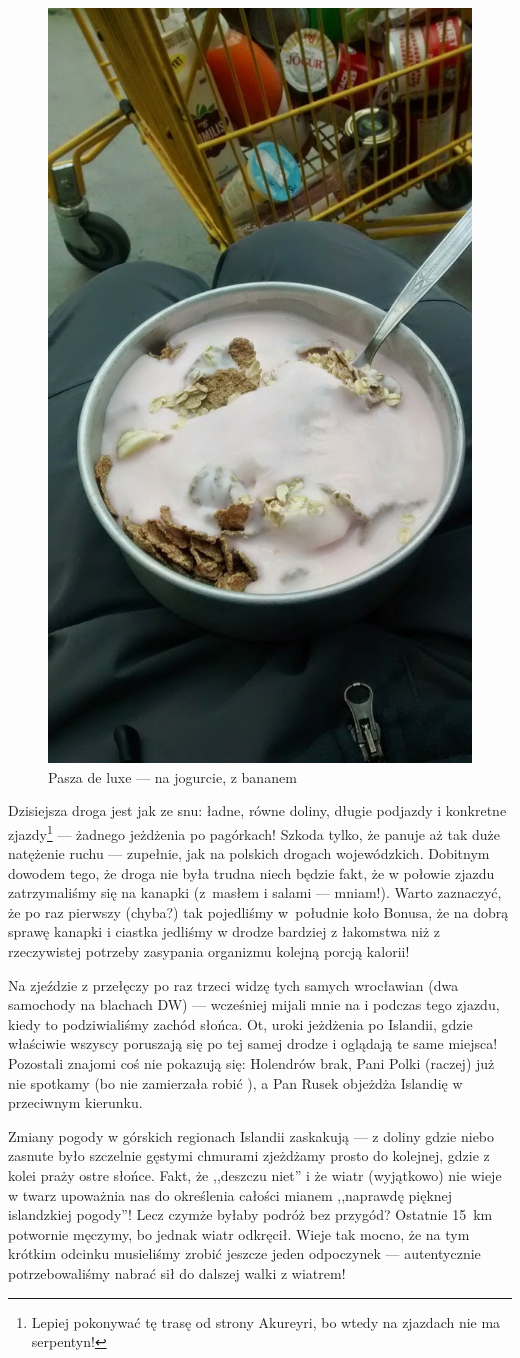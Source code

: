 \begin{figure}[h]
	\centering
	\includegraphics[height=.7\linewidth]{./photos/x-s-2014-08-10_13-54-57__90.jpg}
	\caption*{Pasza de luxe --- na jogurcie, z bananem\textellipsis}
	\label{img:feeder_de_luxe}
\end{figure}

Dzisiejsza droga jest jak ze snu: ładne, równe doliny, długie podjazdy i konkretne zjazdy\footnote{Lepiej pokonywać tę trasę od strony Akureyri, bo wtedy na zjazdach nie ma serpentyn!} --- żadnego jeżdżenia po pagórkach! Szkoda tylko, że panuje aż tak duże natężenie ruchu --- zupełnie, jak na polskich drogach wojewódzkich. Dobitnym dowodem tego, że droga nie była trudna niech będzie fakt, że w połowie zjazdu zatrzymaliśmy się na kanapki (z~masłem i salami --- mniam!). Warto zaznaczyć, że po raz pierwszy (chyba?) tak pojedliśmy w~południe koło Bonusa, że na dobrą sprawę kanapki i ciastka jedliśmy w drodze bardziej z łakomstwa niż z rzeczywistej potrzeby zasypania organizmu kolejną porcją kalorii!

Na zjeździe z przełęczy po raz trzeci widzę tych samych wrocławian (dwa samochody na blachach DW) --- wcześniej mijali mnie na  i podczas tego zjazdu, kiedy to podziwialiśmy zachód słońca. Ot, uroki jeżdżenia po Islandii, gdzie właściwie wszyscy poruszają się po tej samej drodze i oglądają te same miejsca! Pozostali znajomi coś nie pokazują się: Holendrów brak, Pani Polki (raczej) już nie spotkamy (bo nie zamierzała robić ), a Pan Rusek objeżdża Islandię w przeciwnym kierunku.

Zmiany pogody w górskich regionach Islandii zaskakują --- z doliny gdzie niebo zasnute było szczelnie gęstymi chmurami zjeżdżamy prosto do kolejnej, gdzie z kolei praży ostre słońce. Fakt, że ,,deszczu niet'' i że wiatr (wyjątkowo) nie wieje w twarz upoważnia nas do określenia całości mianem ,,naprawdę pięknej islandzkiej pogody''! Lecz czymże byłaby podróż bez przygód? Ostatnie 15~km potwornie męczymy, bo jednak wiatr odkręcił. Wieje tak mocno, że na tym krótkim odcinku musieliśmy zrobić jeszcze jeden odpoczynek --- autentycznie potrzebowaliśmy nabrać sił do dalszej walki z wiatrem!

